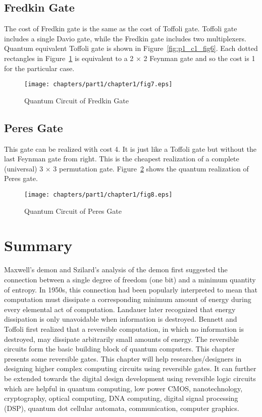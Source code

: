 \subsection{Fredkin Gate}
The cost of Fredkin gate is the same as the cost of Toffoli gate. Toffoli gate includes a single Davio gate, while the Fredkin gate includes two multiplexers. Quantum equivalent Toffoli gate is shown in Figure~\ref{fig:p1_c1_fig6}. Each dotted rectangles in Figure~\ref{fig:p1_c1_fig7} is equivalent to a 2 $\times$ 2 Feynman gate and so the cost is 1 for the particular case.

\begin{figure}[h]
\centering
\texttt{[image: chapters/part1/chapter1/fig7.eps]}
\caption{Quantum Circuit of Fredkin Gate}
\label{fig:p1_c1_fig7}
\end{figure}

\subsection{Peres Gate}
This gate can be realized with cost 4. It is just like a Toffoli gate but without the last Feynman gate from right. This is the cheapest realization of a complete (universal) 3 $\times$ 3 permutation gate. Figure~\ref{fig:p1_c1_fig8} shows the quantum realization of Peres gate.
\\
\begin{figure}[h]
\centering
\texttt{[image: chapters/part1/chapter1/fig8.eps]}
\caption{Quantum Circuit of Peres Gate}
\label{fig:p1_c1_fig8}
\end{figure}

\section{Summary}
Maxwell's demon and Szilard's analysis of the demon first suggested the connection between a single degree of freedom (one bit) and a minimum quantity of entropy. In 1950s, this connection had been popularly interpreted to mean that computation must dissipate a corresponding minimum amount of energy during every elemental act of computation. Landauer later recognized that energy dissipation is only unavoidable when information is destroyed. Bennett and Toffoli first realized that a reversible computation, in which no information is destroyed, may dissipate arbitrarily small amounts of energy. The reversible circuits form the basic building block of quantum computers. This chapter presents some reversible gates. This chapter will help researches/designers in designing higher complex computing circuits using reversible gates. It can further be extended towards the digital design development using reversible logic circuits which are helpful in quantum computing, low power CMOS, nanotechnology, cryptography, optical computing, DNA computing, digital signal processing (DSP), quantum dot cellular automata, communication, computer graphics.

